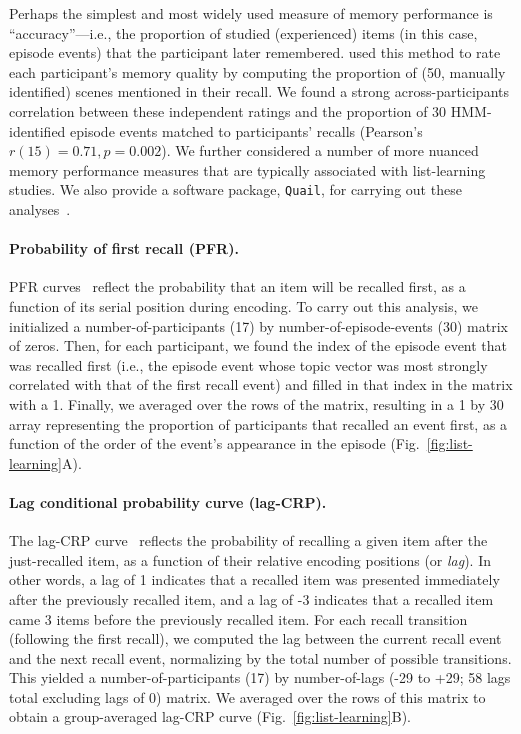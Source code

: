 \documentclass[10pt]{article}
\begin{document}
Perhaps the simplest and most widely used measure of memory performance is ``accuracy''---i.e., the proportion of studied (experienced) items (in this case, episode events) that the participant later remembered.  \cite{ChenEtal17} used this method to rate each participant's memory quality by computing the proportion of (50, manually identified) scenes mentioned in their recall.  We found a strong across-participants correlation between these independent ratings and the proportion of 30 HMM-identified episode events matched to participants' recalls (Pearson's $r(15) = 0.71, p = 0.002$).  We further considered a number of more nuanced memory performance measures that are typically associated with list-learning studies.  We also provide a software package, \texttt{Quail}, for carrying out these analyses~\citep{HeusEtal17b}.

\paragraph{Probability of first recall (PFR).}  PFR curves~\citep{WelcBurn24, PostPhil65, AtkiShif68} reflect the probability that an item will be recalled first, as a function of its serial position during encoding. To carry out this analysis, we initialized a number-of-participants (17) by number-of-episode-events (30) matrix of zeros. Then, for each participant, we found the index of the episode event that was recalled first (i.e., the episode event whose topic vector was most strongly correlated with that of the first recall event) and filled in that index in the matrix with a 1.  Finally, we averaged over the rows of the matrix, resulting in a 1 by 30 array representing the proportion of participants that recalled an event first, as a function of the order of the event's appearance in the episode (Fig.~\ref{fig:list-learning}A).

\paragraph{Lag conditional probability curve (lag-CRP).} The lag-CRP curve~\citep{Kaha96} reflects the probability of recalling a given item after the just-recalled item, as a function of their relative encoding positions (or \textit{lag}).  In other words, a lag of 1 indicates that a recalled item was presented immediately after the previously recalled item, and a lag of -3 indicates that a recalled item came 3 items before the previously recalled item.  For each recall transition (following the first recall), we computed the lag between the current recall event and the next recall event, normalizing by the total number of possible transitions.  This yielded a number-of-participants (17) by number-of-lags (-29 to +29; 58 lags total excluding lags of 0) matrix. We averaged over the rows of this matrix to obtain a group-averaged lag-CRP curve (Fig.~\ref{fig:list-learning}B).
\end{document}
